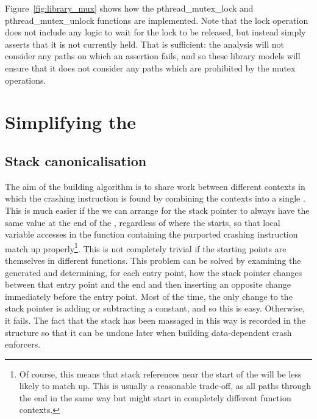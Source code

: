 Figure~\ref{fig:library_mux} shows how the pthread\_mutex\_lock and
pthread\_mutex\_unlock functions are implemented.  Note that the lock
operation does not include any logic to wait for the lock to be
released, but instead simply asserts that it is not currently held.
That is sufficient: the analysis will not consider any paths on which
an assertion fails, and so these library models will ensure that it
does not consider any paths which are prohibited by the mutex
operations.

\section{Simplifying the {\StateMachine}}
\label{sect:derive:simplify_sm}


\subsection{Stack canonicalisation}


The aim of the {\StateMachine} building algorithm is to share work
between different contexts in which the crashing instruction is found
by combining the contexts into a single {\StateMachine}.  This is much
easier if the we can arrange for the stack pointer to always have the
same value at the end of the {\StateMachine}, regardless of where the
{\StateMachine} starts, so that local variable accesses in the
function containing the purported crashing instruction match up
properly\footnote{Of course, this means that stack references near the
  start of the {\StateMachine} will be less likely to match up.  This
  is usually a reasonable trade-off, as all paths through the
  {\StateMachine} end in the same way but might start in completely
  different function contexts.}.  This is not completely trivial if
the starting points are themselves in different functions.  This
problem can be solved by examining the generated {\StateMachine} and
determining, for each entry point, how the stack pointer changes
between that entry point and the end and then inserting an opposite
change immediately before the entry point.  Most of the time, the only
change to the stack pointer is adding or subtracting a constant, and
so this is easy.  Otherwise, it fails.  The fact that the stack has
been massaged in this way is recorded in the {\StateMachine} structure
so that it can be undone later when building data-dependent crash
enforcers.

